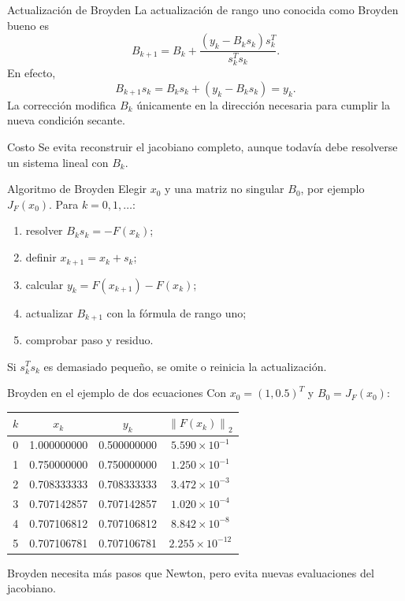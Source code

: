 \documentclass[aspectratio=169,12pt]{beamer}
\newcommand{\norm}[1]{\left\lVert#1\right\rVert}
\begin{document}
\begin{frame}{Actualización de Broyden}
La actualización de rango uno conocida como Broyden bueno es
\[
B_{k+1}
=B_k+
\frac{(y_k-B_ks_k)s_k^T}{s_k^Ts_k}.
\]
En efecto,
\[
B_{k+1}s_k
=B_ks_k+(y_k-B_ks_k)=y_k.
\]
La corrección modifica $B_k$ únicamente en la dirección necesaria para cumplir
la nueva condición secante.
\begin{block}{Costo}
Se evita reconstruir el jacobiano completo, aunque todavía debe resolverse un
sistema lineal con $B_k$.
\end{block}
\end{frame}

\begin{frame}{Algoritmo de Broyden}
Elegir $x_0$ y una matriz no singular $B_0$, por ejemplo $J_F(x_0)$.
Para $k=0,1,\ldots$:
\begin{enumerate}
  \item resolver $B_ks_k=-F(x_k)$;
  \item definir $x_{k+1}=x_k+s_k$;
  \item calcular $y_k=F(x_{k+1})-F(x_k)$;
  \item actualizar $B_{k+1}$ con la fórmula de rango uno;
  \item comprobar paso y residuo.
\end{enumerate}
Si $s_k^Ts_k$ es demasiado pequeño, se omite o reinicia la actualización.
\end{frame}

\begin{frame}{Broyden en el ejemplo de dos ecuaciones}
Con $x_0=(1,0.5)^T$ y $B_0=J_F(x_0)$:
\centering
\begin{tabular}{cccc}
\toprule
$k$ & $x_k$ & $y_k$ & $\norm{F(x_k)}_2$ \\
\midrule
0 & 1.000000000 & 0.500000000 & $5.590\times10^{-1}$ \\
1 & 0.750000000 & 0.750000000 & $1.250\times10^{-1}$ \\
2 & 0.708333333 & 0.708333333 & $3.472\times10^{-3}$ \\
3 & 0.707142857 & 0.707142857 & $1.020\times10^{-4}$ \\
4 & 0.707106812 & 0.707106812 & $8.842\times10^{-8}$ \\
5 & 0.707106781 & 0.707106781 & $2.255\times10^{-12}$ \\
\bottomrule
\end{tabular}

Broyden necesita más pasos que Newton, pero evita nuevas evaluaciones del jacobiano.
\end{frame}
\end{document}
